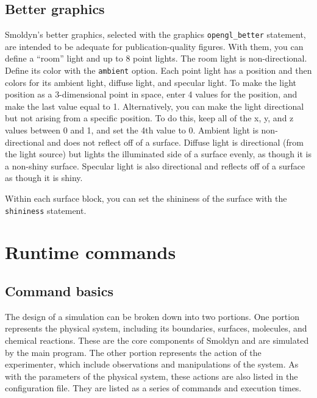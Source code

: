 \documentclass {scrbook}
\newcommand {\ttt} {\texttt}
\begin{document}
\section{Better graphics}

Smoldyn's better graphics, selected with the graphics \ttt{opengl\_better} statement, are intended to be adequate for publication-quality figures. With them, you can define a ``room'' light and up to 8 point lights. The room light is non-directional. Define its color with the \ttt{ambient} option. Each point light has a position and then colors for its ambient light, diffuse light, and specular light. To make the light position as a 3-dimensional point in space, enter 4 values for the position, and make the last value equal to 1. Alternatively, you can make the light directional but not arising from a specific position. To do this, keep all of the x, y, and z values between 0 and 1, and set the 4th value to 0. Ambient light is non-directional and does not reflect off of a surface. Diffuse light is directional (from the light source) but lights the illuminated side of a surface evenly, as though it is a non-shiny surface. Specular light is also directional and reflects off of a surface as though it is shiny.

Within each surface block, you can set the shininess of the surface with the \ttt{shininess} statement.


\chapter{Runtime commands}

\section{Command basics}

The design of a simulation can be broken down into two portions. One portion represents the physical system, including its boundaries, surfaces, molecules, and chemical reactions. These are the core components of Smoldyn and are simulated by the main program. The other portion represents the action of the experimenter, which include observations and manipulations of the system. As with the parameters of the physical system, these actions are also listed in the configuration file. They are listed as a series of commands and execution times.
\end{document}
